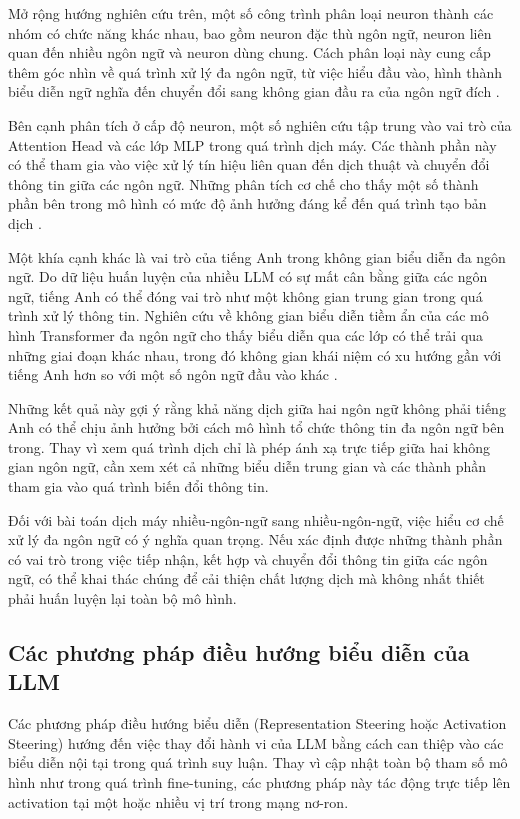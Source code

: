 Mở rộng hướng nghiên cứu trên, một số công trình phân loại neuron thành các nhóm có chức năng khác nhau, bao gồm neuron đặc thù ngôn ngữ, neuron liên quan đến nhiều ngôn ngữ và neuron dùng chung. Cách phân loại này cung cấp thêm góc nhìn về quá trình xử lý đa ngôn ngữ, từ việc hiểu đầu vào, hình thành biểu diễn ngữ nghĩa đến chuyển đổi sang không gian đầu ra của ngôn ngữ đích \cite{Zhang_Lai_Liu_She_Liu_Gong_Huang_Chen_2026}.

Bên cạnh phân tích ở cấp độ neuron, một số nghiên cứu tập trung vào vai trò của Attention Head và các lớp MLP trong quá trình dịch máy. Các thành phần này có thể tham gia vào việc xử lý tín hiệu liên quan đến dịch thuật và chuyển đổi thông tin giữa các ngôn ngữ. Những phân tích cơ chế cho thấy một số thành phần bên trong mô hình có mức độ ảnh hưởng đáng kể đến quá trình tạo bản dịch \cite{binbinliu2026token,zhang2026exploring}.

Một khía cạnh khác là vai trò của tiếng Anh trong không gian biểu diễn đa ngôn ngữ. Do dữ liệu huấn luyện của nhiều LLM có sự mất cân bằng giữa các ngôn ngữ, tiếng Anh có thể đóng vai trò như một không gian trung gian trong quá trình xử lý thông tin. Nghiên cứu về không gian biểu diễn tiềm ẩn của các mô hình Transformer đa ngôn ngữ cho thấy biểu diễn qua các lớp có thể trải qua những giai đoạn khác nhau, trong đó không gian khái niệm có xu hướng gần với tiếng Anh hơn so với một số ngôn ngữ đầu vào khác \cite{wendler-etal-2024-llamas}.

Những kết quả này gợi ý rằng khả năng dịch giữa hai ngôn ngữ không phải tiếng Anh có thể chịu ảnh hưởng bởi cách mô hình tổ chức thông tin đa ngôn ngữ bên trong. Thay vì xem quá trình dịch chỉ là phép ánh xạ trực tiếp giữa hai không gian ngôn ngữ, cần xem xét cả những biểu diễn trung gian và các thành phần tham gia vào quá trình biến đổi thông tin.

Đối với bài toán dịch máy nhiều-ngôn-ngữ sang nhiều-ngôn-ngữ, việc hiểu cơ chế xử lý đa ngôn ngữ có ý nghĩa quan trọng. Nếu xác định được những thành phần có vai trò trong việc tiếp nhận, kết hợp và chuyển đổi thông tin giữa các ngôn ngữ, có thể khai thác chúng để cải thiện chất lượng dịch mà không nhất thiết phải huấn luyện lại toàn bộ mô hình.

\subsection{Các phương pháp điều hướng biểu diễn của LLM}

Các phương pháp điều hướng biểu diễn (Representation Steering hoặc Activation Steering) hướng đến việc thay đổi hành vi của LLM bằng cách can thiệp vào các biểu diễn nội tại trong quá trình suy luận. Thay vì cập nhật toàn bộ tham số mô hình như trong quá trình fine-tuning, các phương pháp này tác động trực tiếp lên activation tại một hoặc nhiều vị trí trong mạng nơ-ron.


